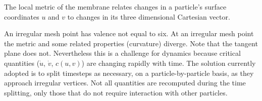 
 \label{sec:dynamics}


The local metric of the membrane relates changes in a particle's surface coordinates $u$ and $v$ to changes in its three dimensional Cartesian vector. 


An irregular mesh point has valence not equal to six.
At an irregular mesh point the metric and some related properties (curvature) diverge.
Note that the tangent plane does not.
Nevertheless this is a challenge for dynamics because critical quantities ($\dot{u}$, $\dot{v}$, $c(u,v)$) are changing rapidly with time.
The solution currently adopted is to split timesteps as necessary, on a particle-by-particle basis, as they approach irregular vertices.
Not all quantities are recomputed during the time splitting, only those that do not require interaction with other particles. 
